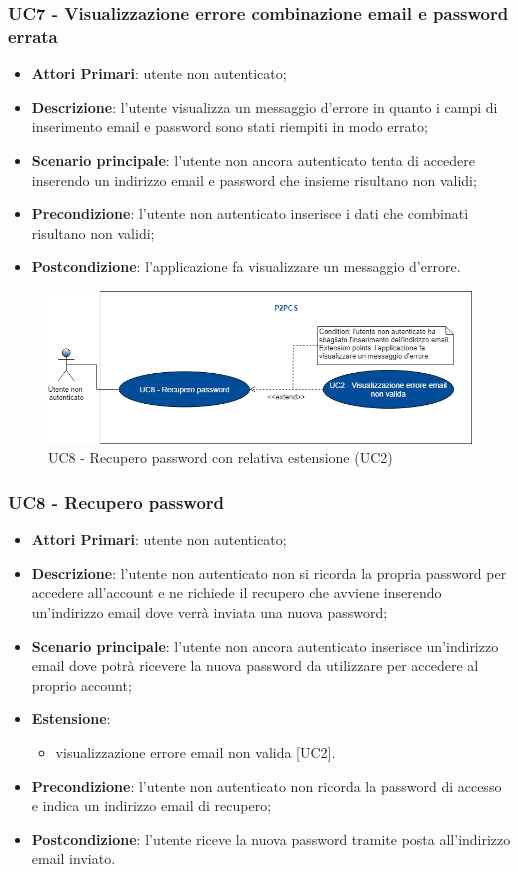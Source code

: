 \subsubsection{UC7 - Visualizzazione errore combinazione email e password errata}
\begin{itemize}
	\item \textbf{Attori Primari}: utente non autenticato;
	\item \textbf{Descrizione}: l'utente visualizza un messaggio d'errore in quanto i campi di inserimento email e password sono stati riempiti in modo errato;
	\item \textbf{Scenario principale}: l'utente non ancora autenticato tenta di accedere inserendo un indirizzo email e password che insieme risultano non validi;	
	\item \textbf{Precondizione}: l'utente non autenticato inserisce i dati che combinati risultano non validi;
	\item \textbf{Postcondizione}: l'applicazione fa visualizzare un messaggio d'errore.
\end{itemize}
\begin{figure}[h]
	\includegraphics[width=15cm]{res/images/Schemagenerale3.png}
	\centering
	\caption{UC8 - Recupero password con relativa estensione (UC2)}
\end{figure}
\subsubsection{UC8 - Recupero password}
\begin{itemize}
	\item \textbf{Attori Primari}: utente non autenticato;
	\item \textbf{Descrizione}: l'utente non autenticato non si ricorda la propria password per accedere all'account e ne richiede il recupero che avviene inserendo un'indirizzo email dove verrà inviata una nuova password;
	\item \textbf{Scenario principale}: l'utente non ancora autenticato inserisce un'indirizzo email dove potrà ricevere la nuova password da utilizzare per accedere al proprio account;
	\item \textbf{Estensione}:
	\begin{itemize}
		\item visualizzazione errore email non valida [UC2].
	\end{itemize} 
	\item \textbf{Precondizione}: l'utente non autenticato non ricorda la password di accesso e indica un indirizzo email di recupero;
	\item \textbf{Postcondizione}: l'utente riceve la nuova password tramite posta all'indirizzo email inviato.
\end{itemize}
